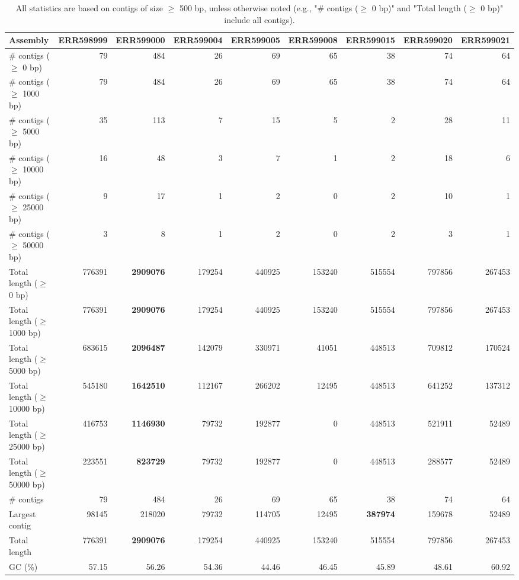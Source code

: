 \documentclass[12pt,a4paper]{article}
\begin{document}
\begin{table}[ht]
\begin{center}
\caption{All statistics are based on contigs of size $\geq$ 500 bp, unless otherwise noted (e.g., "\# contigs ($\geq$ 0 bp)" and "Total length ($\geq$ 0 bp)" include all contigs).}
\begin{tabular}{|l*{8}{|r}|}
\hline
Assembly & ERR598999 & ERR599000 & ERR599004 & ERR599005 & ERR599008 & ERR599015 & ERR599020 & ERR599021 \\ \hline
\# contigs ($\geq$ 0 bp) & 79 & 484 & 26 & 69 & 65 & 38 & 74 & 64 \\ \hline
\# contigs ($\geq$ 1000 bp) & 79 & 484 & 26 & 69 & 65 & 38 & 74 & 64 \\ \hline
\# contigs ($\geq$ 5000 bp) & 35 & 113 & 7 & 15 & 5 & 2 & 28 & 11 \\ \hline
\# contigs ($\geq$ 10000 bp) & 16 & 48 & 3 & 7 & 1 & 2 & 18 & 6 \\ \hline
\# contigs ($\geq$ 25000 bp) & 9 & 17 & 1 & 2 & 0 & 2 & 10 & 1 \\ \hline
\# contigs ($\geq$ 50000 bp) & 3 & 8 & 1 & 2 & 0 & 2 & 3 & 1 \\ \hline
Total length ($\geq$ 0 bp) & 776391 & {\bf 2909076} & 179254 & 440925 & 153240 & 515554 & 797856 & 267453 \\ \hline
Total length ($\geq$ 1000 bp) & 776391 & {\bf 2909076} & 179254 & 440925 & 153240 & 515554 & 797856 & 267453 \\ \hline
Total length ($\geq$ 5000 bp) & 683615 & {\bf 2096487} & 142079 & 330971 & 41051 & 448513 & 709812 & 170524 \\ \hline
Total length ($\geq$ 10000 bp) & 545180 & {\bf 1642510} & 112167 & 266202 & 12495 & 448513 & 641252 & 137312 \\ \hline
Total length ($\geq$ 25000 bp) & 416753 & {\bf 1146930} & 79732 & 192877 & 0 & 448513 & 521911 & 52489 \\ \hline
Total length ($\geq$ 50000 bp) & 223551 & {\bf 823729} & 79732 & 192877 & 0 & 448513 & 288577 & 52489 \\ \hline
\# contigs & 79 & 484 & 26 & 69 & 65 & 38 & 74 & 64 \\ \hline
Largest contig & 98145 & 218020 & 79732 & 114705 & 12495 & {\bf 387974} & 159678 & 52489 \\ \hline
Total length & 776391 & {\bf 2909076} & 179254 & 440925 & 153240 & 515554 & 797856 & 267453 \\ \hline
GC (\%) & 57.15 & 56.26 & 54.36 & 44.46 & 46.45 & 45.89 & 48.61 & 60.92 \\ \hline

\end{tabular}
\end{center}
\end{table}
\end{document}
